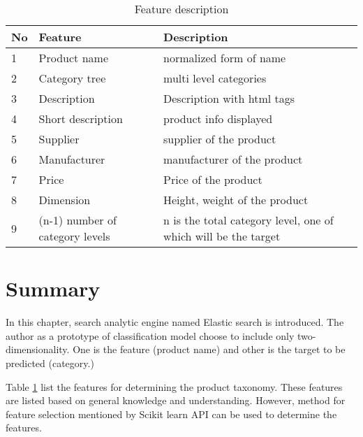 \begin{table}[h]
      \centering
      \caption{Feature description}
      \label{table:feature_decription}
      \begin{tabular}{ lll }
            \toprule
            
            \textbf{No}& \textbf{Feature} & \textbf{Description}\\
            \midrule
            1&Product name & normalized form of name\\
            2&Category tree & multi level categories\\
            3&Description & Description with html tags\\         
            4&Short description  & product info displayed\\
            5&Supplier  &  supplier of the product\\
            6&Manufacturer  &  manufacturer of the product\\           
            7&Price  &  Price of the product\\
            8&Dimension  & Height, weight of the product\\
            9&(n-1) number of  category levels   &  n is the total category level, one of which will be the target\\
           
            \bottomrule
            \end{tabular}


\end{table}


\section{Summary}

In this chapter, search analytic engine named Elastic search is introduced. The author as a prototype of classification model choose to include only two-dimensionality. One is the feature (product name) and other is the target to be predicted (category.)

Table \ref{table:feature_decription} list the features for determining the product taxonomy. These features are listed based on general knowledge and understanding. However, method for feature selection mentioned by Scikit learn API \parencite{sklearn_api} can be used to determine the features.